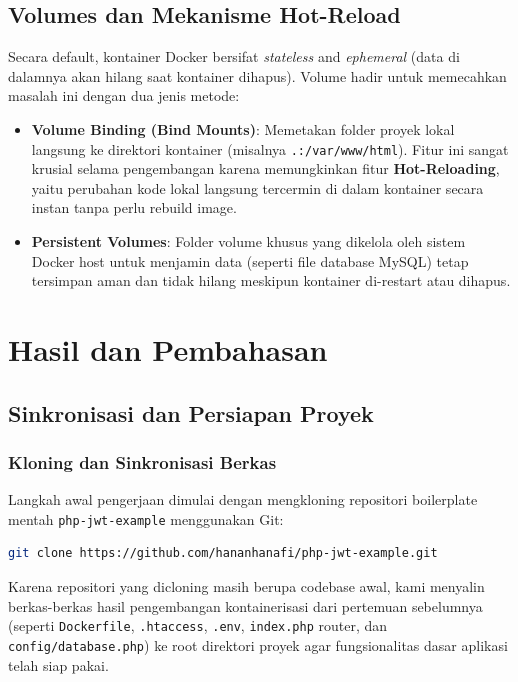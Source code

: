 \documentclass[a4paper,oneside,12pt]{report}
\newcommand{\tocboldsection}[1]{%
  \protect\renewcommand{\protect\cftchapfont}{\protect\bfseries}%
  #1%
  \protect\renewcommand{\protect\cftchapfont}{}%
}
\begin{document}
\section{Volumes dan Mekanisme Hot-Reload}
Secara default, kontainer Docker bersifat \textit{stateless} and \textit{ephemeral} (data di dalamnya akan hilang saat kontainer dihapus). Volume hadir untuk memecahkan masalah ini dengan dua jenis metode:
\begin{itemize}
    \item \textbf{Volume Binding (Bind Mounts)}: Memetakan folder proyek lokal langsung ke direktori kontainer (misalnya \texttt{.:/var/www/html}). Fitur ini sangat krusial selama pengembangan karena memungkinkan fitur \textbf{Hot-Reloading}, yaitu perubahan kode lokal langsung tercermin di dalam kontainer secara instan tanpa perlu rebuild image.
    \item \textbf{Persistent Volumes}: Folder volume khusus yang dikelola oleh sistem Docker host untuk menjamin data (seperti file database MySQL) tetap tersimpan aman dan tidak hilang meskipun kontainer di-restart atau dihapus.
\end{itemize}

\clearpage

\chapter[\texorpdfstring{\tocboldsection{Hasil dan Pembahasan}}{Hasil dan Pembahasan}]{Hasil dan Pembahasan}

\section{Sinkronisasi dan Persiapan Proyek}

\subsection{Kloning dan Sinkronisasi Berkas}
Langkah awal pengerjaan dimulai dengan mengkloning repositori boilerplate mentah \texttt{php-jwt-example} menggunakan Git:
\begin{lstlisting}[style=commonstyle, language=bash]
git clone https://github.com/hananhanafi/php-jwt-example.git
\end{lstlisting}
Karena repositori yang dicloning masih berupa codebase awal, kami menyalin berkas-berkas hasil pengembangan kontainerisasi dari pertemuan sebelumnya (seperti \texttt{Dockerfile}, \texttt{.htaccess}, \texttt{.env}, \texttt{index.php} router, dan \texttt{config/database.php}) ke root direktori proyek agar fungsionalitas dasar aplikasi telah siap pakai.
\end{document}

